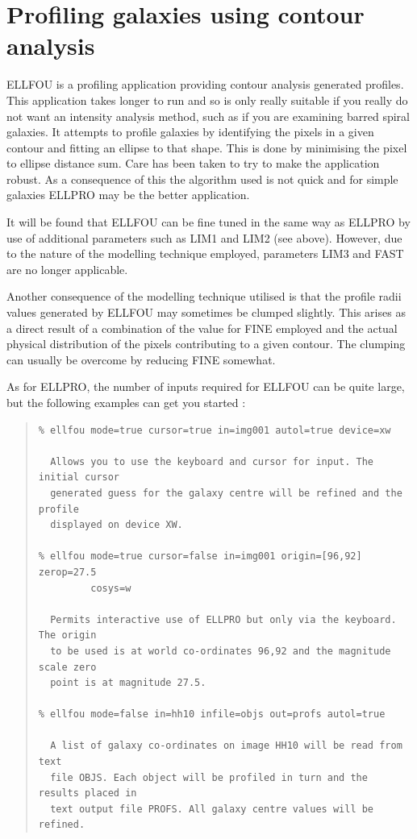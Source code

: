 \documentclass[twoside,11pt]{article}
\newcommand{\xlabel}[1]{}
\newenvironment{myquote}{\begin{quote}\begin{small}}{\end{small}\end{quote}}
\begin{document}
\section{Profiling galaxies using contour analysis}
\xlabel{ELLFOU}
\label{sec:profc}

ELLFOU is a profiling application providing contour analysis generated profiles.
This application takes longer to run and so is only really suitable if you
really do not want an intensity analysis method, such as if you are
examining barred spiral galaxies. It attempts to profile galaxies by identifying 
the pixels in a given contour and fitting an ellipse to that shape. This is 
done by minimising the pixel to ellipse distance sum. Care has been taken 
to try to make the application robust. As a consequence of this the algorithm 
used is not quick and for simple galaxies ELLPRO may be the better application.

It will be found that ELLFOU can be fine tuned in the same way as ELLPRO 
by use of additional parameters such as LIM1 and LIM2 (see above). However, 
due to the nature of the modelling technique employed, parameters LIM3 
and FAST are no longer applicable. 

Another consequence of the modelling technique utilised is that the profile 
radii values generated by ELLFOU may sometimes be clumped slightly. 
This arises as a direct result of a combination of the value for FINE 
employed and the actual physical distribution of the pixels contributing
to a given contour. The clumping can usually be overcome by reducing FINE 
somewhat.

As for ELLPRO, the number of inputs required for ELLFOU can be quite large, 
but the following examples can get you started :

\begin{myquote}
\begin{verbatim}
% ellfou mode=true cursor=true in=img001 autol=true device=xw

  Allows you to use the keyboard and cursor for input. The initial cursor 
  generated guess for the galaxy centre will be refined and the profile 
  displayed on device XW.

% ellfou mode=true cursor=false in=img001 origin=[96,92] zerop=27.5
         cosys=w

  Permits interactive use of ELLPRO but only via the keyboard. The origin 
  to be used is at world co-ordinates 96,92 and the magnitude scale zero 
  point is at magnitude 27.5.

% ellfou mode=false in=hh10 infile=objs out=profs autol=true

  A list of galaxy co-ordinates on image HH10 will be read from text 
  file OBJS. Each object will be profiled in turn and the results placed in 
  text output file PROFS. All galaxy centre values will be refined.
\end{verbatim}
\end{myquote}
\end{document}
